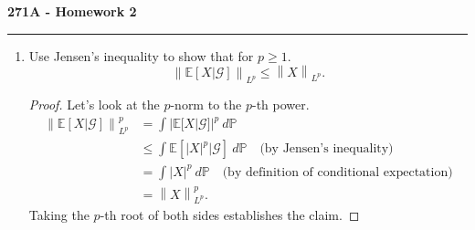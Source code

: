 \documentclass[11pt,letterpaper]{report}
\newcommand{\mcal}[1]{\mathcal{#1}}
\newcommand{\Lp}[2]{\left\|{#1}\right\|_{L^{#2}}}
\newcommand{\E}{\mathbb{E}}
\newcommand{\prob}{\mathbb{P}}{}
\begin{document}
\begin{center}
{\bf \Large 271A - Homework 2} %
\vspace{0.2cm}
\hrule
\end{center}

\begin{enumerate}
	\item Use Jensen's inequality to show that for $p\geq 1$.
	\[
	\Lp{\E[X|\mcal{G}]}{p} \leq \Lp{X}{p}.
	\]
	\begin{proof}
		Let's look at the $p$-norm to the $p$-th power.
		\begin{align*}
			\Lp{\E[X|\mcal{G}]}{p}^p &= \int |\E[X|\mcal{G}]|^p\ d\prob\\
			&\leq \int\E[|X|^p|\mcal{G}]\ d\prob\quad\text{(by Jensen's inequality)}\\
			&= \int |X|^p\ d\prob\quad\text{(by definition of conditional expectation)}\\
			&= \Lp{X}{p}^p.
		\end{align*}
		Taking the $p$-th root of both sides establishes the claim.
	\end{proof}


\end{enumerate}
\end{document}
